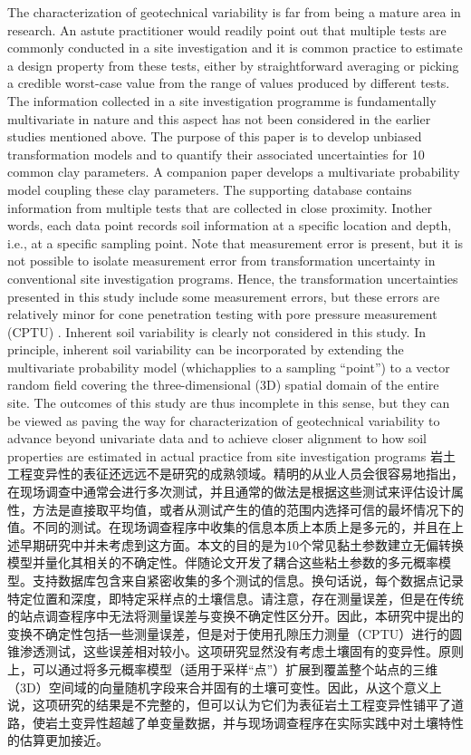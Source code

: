 \begin{Parallel}{0.60\textwidth}{}
{        The characterization of geotechnical variability is far from being a mature area in research. An astute practitioner would readily point out that multiple tests are commonly conducted in a site investigation and it is common practice to estimate a design property from these tests, either by straightforward averaging or picking a credible worst-case value from the range of values produced by different tests. The information collected in a site investigation programme is fundamentally multivariate in nature and this aspect has not been considered in the earlier studies mentioned above. The purpose of this paper is to develop unbiased transformation models and to quantify their associated uncertainties for 10 common clay parameters. A companion paper \citep{Ching2014686} develops a multivariate probability model coupling these clay parameters. The supporting database contains information from multiple tests that are collected in close proximity. Inother words, each data point records soil information at a specific location and depth, i.e., at a specific sampling point. Note that measurement error is present, but it is not possible to isolate measurement error from transformation uncertainty in conventional site investigation programs. Hence, the transformation uncertainties presented in this study include some measurement errors, but these errors are relatively minor for cone penetration testing with pore pressure measurement (CPTU) \citep{Phoon1999612}. Inherent soil variability is clearly not considered in this study. In principle, inherent soil variability can be incorporated by extending the multivariate probability model (whichapplies to a sampling “point”) to a vector random field covering the three-dimensional (3D) spatial domain of the entire site. The outcomes of this study are thus incomplete in this sense, but they can be viewed as paving the way for characterization of geotechnical variability to advance beyond univariate data and to achieve closer alignment to how soil properties are estimated in actual practice from site investigation programs
    }
    \ParallelRText
    {
        岩土工程变异性的表征还远远不是研究的成熟领域。精明的从业人员会很容易地指出，在现场调查中通常会进行多次测试，并且通常的做法是根据这些测试来评估设计属性，方法是直接取平均值，或者从测试产生的值的范围内选择可信的最坏情况下的值。不同的测试。在现场调查程序中收集的信息本质上本质上是多元的，并且在上述早期研究中并未考虑到这方面。本文的目的是为10个常见黏土参数建立无偏转换模型并量化其相关的不确定性。伴随论文\citep{Ching2014686}开发了耦合这些粘土参数的多元概率模型。支持数据库包含来自紧密收集的多个测试的信息。换句话说，每个数据点记录特定位置和深度，即特定采样点的土壤信息。请注意，存在测量误差，但是在传统的站点调查程序中无法将测量误差与变换不确定性区分开。因此，本研究中提出的变换不确定性包括一些测量误差，但是对于使用孔隙压力测量（CPTU）进行的圆锥渗透测试，这些误差相对较小\citep{Phoon1999612}。这项研究显然没有考虑土壤固有的变异性。原则上，可以通过将多元概率模型（适用于采样“点”）扩展到覆盖整个站点的三维（3D）空间域的向量随机字段来合并固有的土壤可变性。因此，从这个意义上说，这项研究的结果是不完整的，但可以认为它们为表征岩土工程变异性铺平了道路，使岩土变异性超越了单变量数据，并与现场调查程序在实际实践中对土壤特性的估算更加接近。
}
\end{Parallel}
